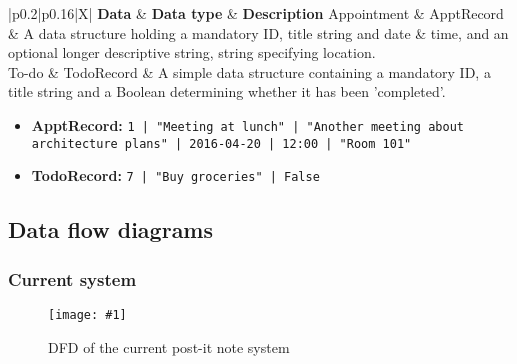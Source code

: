 \newcommand{\dictline}[1]{#1 \\ \hline}
\begin{table}[H]
    \centering
    \begin{tabularx}{\linewidth}{|p{0.2\linewidth}|p{0.16\linewidth}|X|} \hline
        \textbf{Data} & \textbf{Data type} &
        \textbf{Description} \R
        \dictline{Appointment & ApptRecord
          & A data structure holding a mandatory ID, title string and date \&
          time, and an optional longer descriptive string, string specifying
          location.}
        \dictline{To-do & TodoRecord
          & A simple data structure containing a mandatory ID, a title string
          and a Boolean determining whether it has been 'completed'.}
    \end{tabularx}
    \caption{The analysis data dictionary.}
    \label{tbl:add}
\end{table}

\begin{itemize}
    \item \textbf{ApptRecord:}
    \texttt{1 | "Meeting at lunch" | "Another meeting about architecture plans"
    | 2016-04-20 | 12:00 | "Room 101"}
    \item \textbf{TodoRecord:}
    \texttt{7 | "Buy groceries" | False}
\end{itemize}

\subsection{Data flow diagrams}
\subsubsection{Current system}

\newcommand{\addfigure}[3]{
    \begin{figure}[H]
        \centering
        \texttt{[image: \#1]}
        \caption{#2}
        \label{#3}
    \end{figure}
}

\addfigure
    {dfd-orig}
    {DFD of the current post-it note system}
    {fig:dfd-orig}

